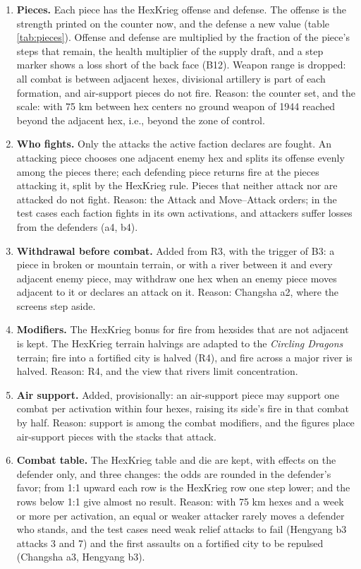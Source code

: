 \documentclass[11pt]{article}
\begin{document}
\begin{enumerate}[label=M\arabic*.,leftmargin=*,itemsep=3pt]
\item \textbf{Pieces.} Each piece has the HexKrieg offense and defense. The offense is the strength printed on the counter now, and the defense a new value (table \ref{tab:pieces}). Offense and defense are multiplied by the fraction of the piece's steps that remain, the health multiplier of the supply draft, and a step marker shows a loss short of the back face (B12). Weapon range is dropped: all combat is between adjacent hexes, divisional artillery is part of each formation, and air-support pieces do not fire. Reason: the counter set, and the scale: with 75 km between hex centers no ground weapon of 1944 reached beyond the adjacent hex, i.e., beyond the zone of control.
\item \textbf{Who fights.} Only the attacks the active faction declares are fought. An attacking piece chooses one adjacent enemy hex and splits its offense evenly among the pieces there; each defending piece returns fire at the pieces attacking it, split by the HexKrieg rule. Pieces that neither attack nor are attacked do not fight. Reason: the Attack and Move--Attack orders; in the test cases each faction fights in its own activations, and attackers suffer losses from the defenders (a4, b4).
\item \textbf{Withdrawal before combat.} Added from R3, with the trigger of B3: a piece in broken or mountain terrain, or with a river between it and every adjacent enemy piece, may withdraw one hex when an enemy piece moves adjacent to it or declares an attack on it. Reason: Changsha a2, where the screens step aside.
\item \textbf{Modifiers.} The HexKrieg bonus for fire from hexsides that are not adjacent is kept. The HexKrieg terrain halvings are adapted to the \emph{Circling Dragons} terrain; fire into a fortified city is halved (R4), and fire across a major river is halved. Reason: R4, and the view that rivers limit concentration.
\item \textbf{Air support.} Added, provisionally: an air-support piece may support one combat per activation within four hexes, raising its side's fire in that combat by half. Reason: support is among the combat modifiers, and the figures place air-support pieces with the stacks that attack.
\item \textbf{Combat table.} The HexKrieg table and die are kept, with effects on the defender only, and three changes: the odds are rounded in the defender's favor; from 1:1 upward each row is the HexKrieg row one step lower; and the rows below 1:1 give almost no result. Reason: with 75 km hexes and a week or more per activation, an equal or weaker attacker rarely moves a defender who stands, and the test cases need weak relief attacks to fail (Hengyang b3 attacks 3 and 7) and the first assaults on a fortified city to be repulsed (Changsha a3, Hengyang b3).

\end{enumerate}
\end{document}

